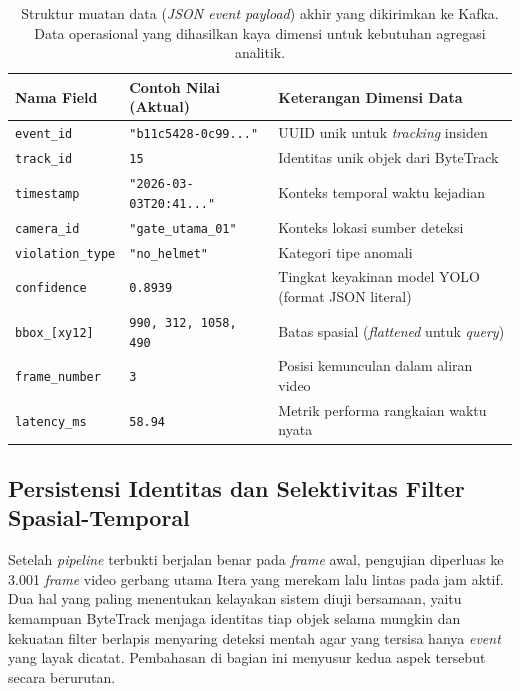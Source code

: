 \begin{table}[htbp]
\centering
\caption{Struktur muatan data (\textit{JSON event payload}) akhir yang dikirimkan ke Kafka. Data operasional yang dihasilkan kaya dimensi untuk kebutuhan agregasi analitik.}
\label{tab:json-output}
\footnotesize
\setlength{\tabcolsep}{4pt}
\begin{tabular}{p{} p{} p{}}
\toprule
\textbf{Nama Field} & \textbf{Contoh Nilai (Aktual)} & \textbf{Keterangan Dimensi Data} \\
\midrule
\texttt{event\_id}     & \texttt{"b11c5428-0c99..."}    & UUID unik untuk \textit{tracking} insiden \\
\texttt{track\_id}     & \texttt{15}                    & Identitas unik objek dari ByteTrack \\
\texttt{timestamp}     & \texttt{"2026-03-03T20:41..."} & Konteks temporal waktu kejadian \\
\texttt{camera\_id}    & \texttt{"gate\_utama\_01"}     & Konteks lokasi sumber deteksi \\
\texttt{violation\_type} & \texttt{"no\_helmet"}         & Kategori tipe anomali \\
\texttt{confidence}    & \texttt{0.8939}                & Tingkat keyakinan model YOLO (format JSON literal) \\
\texttt{bbox\_[xy12]}  & \texttt{990, 312, 1058, 490}   & Batas spasial (\textit{flattened} untuk \textit{query}) \\
\texttt{frame\_number} & \texttt{3}                     & Posisi kemunculan dalam aliran video \\
\texttt{latency\_ms}   & \texttt{58.94}                 & Metrik performa rangkaian waktu nyata \\
\bottomrule
\end{tabular}
\end{table}

\subsection{Persistensi Identitas dan Selektivitas Filter Spasial-Temporal}
\label{subsec:persistensi-filter}

Setelah \textit{pipeline} terbukti berjalan benar pada \textit{frame} awal, pengujian diperluas ke 3.001 \textit{frame} video gerbang utama Itera yang merekam lalu lintas pada jam aktif. Dua hal yang paling menentukan kelayakan sistem diuji bersamaan, yaitu kemampuan ByteTrack menjaga identitas tiap objek selama mungkin dan kekuatan filter berlapis menyaring deteksi mentah agar yang tersisa hanya \textit{event} yang layak dicatat. Pembahasan di bagian ini menyusur kedua aspek tersebut secara berurutan.

